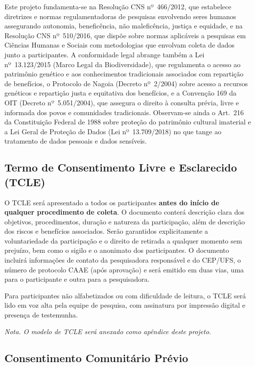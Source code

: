 \documentclass[12pt,a4paper,brazil]{article}
\begin{document}
Este projeto fundamenta-se na Resolução CNS nº~466/2012, que estabelece diretrizes e normas regulamentadoras de pesquisas envolvendo seres humanos assegurando autonomia, beneficência, não maleficência, justiça e equidade, e na Resolução CNS nº~510/2016, que dispõe sobre normas aplicáveis a pesquisas em Ciências Humanas e Sociais com metodologias que envolvam coleta de dados junto a participantes. A conformidade legal abrange também a Lei nº~13.123/2015 (Marco Legal da Biodiversidade), que regulamenta o acesso ao patrimônio genético e aos conhecimentos tradicionais associados com repartição de benefícios, o Protocolo de Nagoia (Decreto nº~2/2004) sobre acesso a recursos genéticos e repartição justa e equitativa dos benefícios, e a Convenção 169 da OIT (Decreto nº~5.051/2004), que assegura o direito à consulta prévia, livre e informada dos povos e comunidades tradicionais. Observam-se ainda o Art.~216 da Constituição Federal de 1988 sobre proteção do patrimônio cultural imaterial e a Lei Geral de Proteção de Dados (Lei nº~13.709/2018) no que tange ao tratamento de dados pessoais e dados sensíveis.

\subsection{Termo de Consentimento Livre e Esclarecido (TCLE)}

O TCLE será apresentado a todos os participantes \textbf{antes do início de qualquer procedimento de coleta}. O documento conterá descrição clara dos objetivos, procedimentos, duração e natureza da participação, além de descrição dos riscos e benefícios associados. Serão garantidos explicitamente a voluntariedade da participação e o direito de retirada a qualquer momento sem prejuízo, bem como o sigilo e o anonimato dos participantes. O documento incluirá informações de contato da pesquisadora responsável e do CEP/UFS, o número de protocolo CAAE (após aprovação) e será emitido em duas vias, uma para o participante e outra para a pesquisadora.

Para participantes não alfabetizados ou com dificuldade de leitura, o TCLE será lido em voz alta pela equipe de pesquisa, com assinatura por impressão digital e presença de testemunha.

\textit{Nota. O modelo de TCLE será anexado como apêndice deste projeto.}

\subsection{Consentimento Comunitário Prévio}
\end{document}
